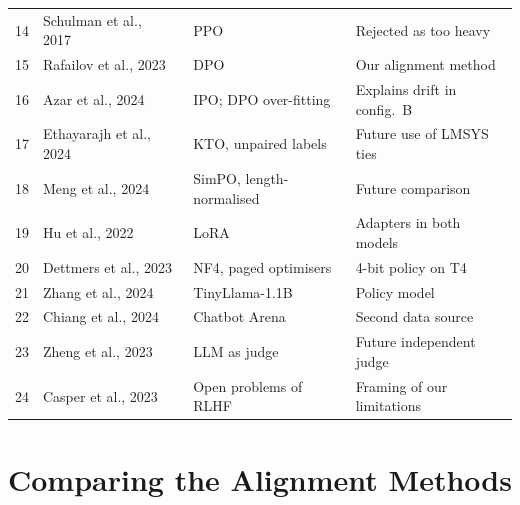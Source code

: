 {\begin{longtable}{@{}L{0.6cm}L{3.6cm}L{5.0cm}L{4.9cm}@{}}
14 & Schulman et al., 2017~\cite{schulman2017ppo} & PPO & Rejected as too heavy\\
15 & Rafailov et al., 2023~\cite{rafailov2023dpo} & DPO & Our alignment method\\
16 & Azar et al., 2024~\cite{azar2024ipo} & IPO; DPO over-fitting & Explains drift in config.\ B\\
17 & Ethayarajh et al., 2024~\cite{ethayarajh2024kto} & KTO, unpaired labels & Future use of LMSYS ties\\
18 & Meng et al., 2024~\cite{meng2024simpo} & SimPO, length-normalised & Future comparison\\
19 & Hu et al., 2022~\cite{hu2022lora} & LoRA & Adapters in both models\\
20 & Dettmers et al., 2023~\cite{dettmers2023qlora} & NF4, paged optimisers & 4-bit policy on T4\\
21 & Zhang et al., 2024~\cite{zhang2024tinyllama} & TinyLlama-1.1B & Policy model\\
22 & Chiang et al., 2024~\cite{chiang2024arena} & Chatbot Arena & Second data source\\
23 & Zheng et al., 2023~\cite{zheng2023judging} & LLM as judge & Future independent judge\\
24 & Casper et al., 2023~\cite{casper2023open} & Open problems of RLHF & Framing of our limitations\\
\end{longtable}
}

\section{Comparing the Alignment Methods}
\label{sec:lit-compare}

